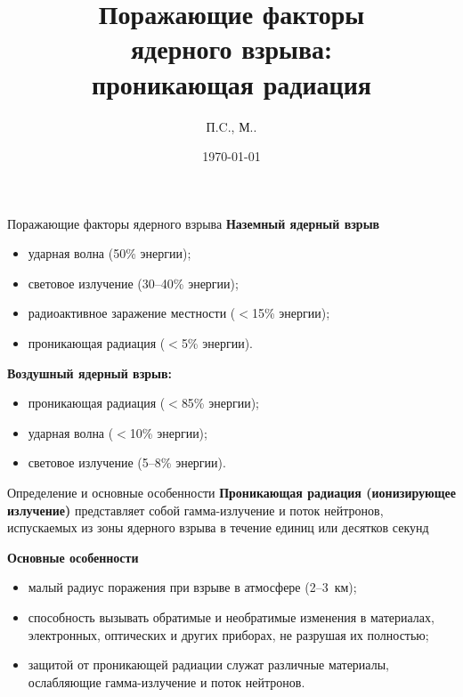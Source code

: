 \documentclass[unicode,lefteqn,c,hyperref={pdfpagelabels=false},12pt]{beamer}
\title[\hbox to 56mm{Проникающая радиация\hfill\insertframenumber\,/\,\inserttotalframenumber}]{Поражающие факторы \\ядерного взрыва: \\проникающая радиация}
\author[П.\shortspace C.\shortspaceАндрианов, М.\shortspaceО.\shortspaceБурмистров]{П.\shortspace C.\shortspaceАндрианов, М.\shortspaceО.\shortspaceБурмистров}
\institute{\vfill Московский физико-технический институт
		\vfill Военная кафедра}
\date{\today}
\begin{document}
\begin{frame}
    \titlepage
\end{frame}
\begin{frame}{Поражающие факторы ядерного взрыва}
    \textbf{Наземный ядерный взрыв}
    \begin{itemize}
    		\item ударная волна (50\% энергии);
    		\item световое излучение (30--40\% энергии);
    		\item радиоактивное заражение местности ($<$15\% энергии);
            \item проникающая радиация ($<$5\% энергии).
    \end{itemize}
    \bigskip
    \textbf{Воздушный ядерный взрыв:}
    \begin{itemize}
            \item проникающая радиация ($<$85\% энергии);
            \item ударная волна ($<$10\% энергии);
            \item световое излучение (5--8\% энергии).
    \end{itemize}

  
\end{frame}

\begin{frame}{Определение и основные особенности}
    \textbf{Проникающая радиация (ионизирующее излучение)}  представляет собой гамма-излучение и поток нейтронов, испускаемых из зоны ядерного взрыва в течение единиц или десятков секунд

    \smallskip

    \textbf{Основные особенности}
    \begin{itemize}
            \item малый радиус поражения при взрыве в атмосфере (2--3~км);
            \item способность вызывать обратимые и необратимые изменения в материалах, электронных, оптических и других приборах, не разрушая их полностью;
            \item защитой от проникающей радиации служат различные материалы, ослабляющие гамма-излучение и поток нейтронов.
    \end{itemize}
\end{frame}
\end{document}

